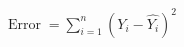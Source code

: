 \documentclass[preview]{standalone}
\begin{document}
\begin{center}
$\displaystyle \operatorname {Error} =\sum _{i=1}^{n}\left(Y_{i}-{\hat {Y_{i}}}\right)^{2}$
\end{center}
\end{document}
